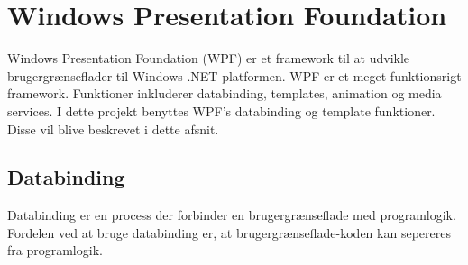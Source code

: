 \section{Windows Presentation Foundation}

Windows Presentation Foundation (WPF) er et framework til at udvikle brugergrænseflader til Windows .NET platformen. WPF er et meget funktionsrigt framework. Funktioner inkluderer databinding, templates, animation og media services. I dette projekt benyttes WPF's databinding og template funktioner. Disse vil blive beskrevet i dette afsnit.

\subsection{Databinding}

Databinding er en process der forbinder en brugergrænseflade med programlogik. Fordelen ved at bruge databinding er, at brugergrænseflade-koden kan sepereres fra programlogik. 
